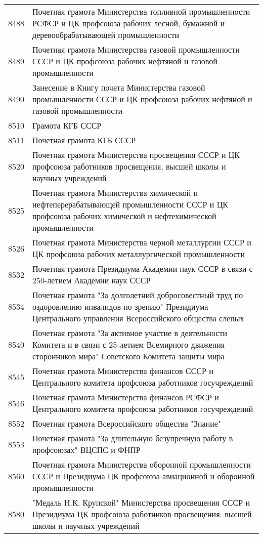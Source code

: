 \documentclass[10pt, a4paper, titlepage]{article}
\begin{document}
\begin{center}
\begin{longtable}{rp{}}
        8488 & Почетная грамота Министерства топливной промышленности РСФСР и ЦК профсоюза рабочих лесной, бумажной и деревообрабатывающей промышленности \\
        8489 & Почетная грамота Министерства газовой промышленности СССР и ЦК профсоюза рабочих нефтяной и газовой промышленности \\
        8490 & Занесение в Книгу почета Министерства газовой промышленности СССР и ЦК профсоюза рабочих нефтяной и газовой промышленности \\
        8510 & Грамота КГБ СССР \\
        8511 & Почетная грамота КГБ СССР \\
        8520 & Почетная грамота Министерства просвещения СССР и ЦК профсоюза работников просвещения, высшей школы и научных учреждений \\
        8525 & Почетная грамота Министерства химической и нефтеперерабатывающей промышленности СССР и ЦК профсоюза рабочих химической и нефтехимической промышленности \\
        8526 & Почетная грамота Министерства черной металлургии СССР и ЦК профсоюза рабочих металлургической промышленности \\
        8532 & Почетная грамота Президиума Академии наук СССР в связи с 250-летием Академии наук СССР \\
        8534 & Почетная грамота "За долголетний добросовестный труд по оздоровлению инвалидов по зрению" Президиума Центрального управления Всероссийского общества слепых \\
        8540 & Почетная грамота "За активное участие в деятельности Комитета и в связи с 25-летием Всемирного движения сторонников мира" Советского Комитета защиты мира \\
        8545 & Почетная грамота Министерства финансов СССР и Центрального комитета профсоюза работников госучреждений \\
        8546 & Почетная грамота Министерства финансов РСФСР и Центрального комитета профсоюза работников госучреждений \\
        8552 & Почетная грамота Всероссийского общества "Знание" \\
        8553 & Почетная грамота "За длительную безупречную работу в профсоюзах" ВЦСПС и ФНПР \\
        8560 & Почетная грамота Министерства оборонной промышленности СССР и Президиума ЦК профсоюза авиационной и оборонной промышленности \\
        8580 & "Медаль Н.К. Крупской" Министерства просвещения СССР и Президиума ЦК профсоюза работников просвещения. высшей школы и научных учреждений \\

\end{longtable}
\end{center}
\end{document}
